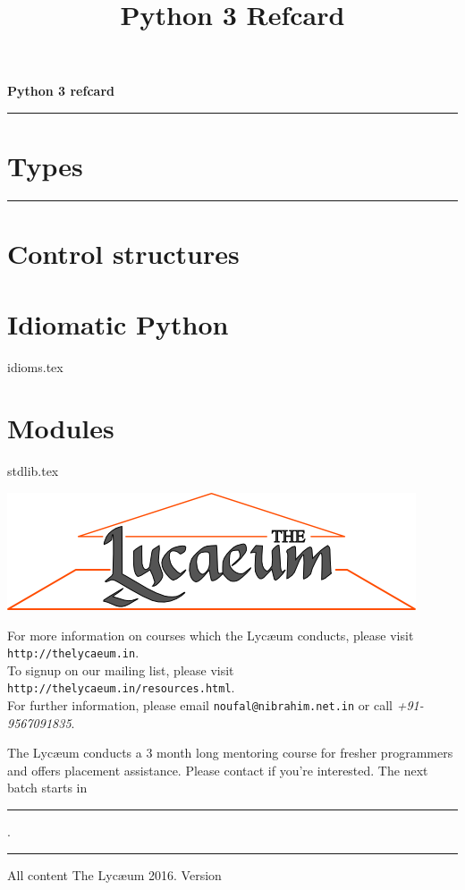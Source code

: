 \documentclass{refsheet}
\title{Python 3 Refcard}
\date{}
\author{}
\begin{document}
\begin{center}
\Large \textbf{Python 3 refcard}
\noindent\rule{\linewidth}{0.5ex}
\end{center}
\normalsize

\section{Types}







\noindent\rule{\linewidth}{0.05ex}
\section{Control structures}







\section{Idiomatic Python}
 {idioms.tex}

\section{Modules}
 {stdlib.tex}

\begin{center}
\includegraphics[scale=0.4]{images/parthenon-callig.png}
\end{center}
For more information on courses which the Lyc\ae{}um conducts, please
visit \texttt{http://thelycaeum.in}. \\To signup on our mailing list,
please visit \texttt{http://thelycaeum.in/resources.html}. \\For further
information, please email \texttt{noufal@nibrahim.net.in} or call
\textit{+91-9567091835}.
\vspace{0.5cm}

The Lyc\ae{}um conducts a 3 month long mentoring course for fresher
programmers and offers placement assistance. Please contact if you're
interested. The next batch starts in \rule{3cm}{0.1ex}.

\noindent\rule{\linewidth}{0.05ex}
\footnotesize All content \textcopyright The Lyc\ae{}um 2016. Version 
\end{document}
